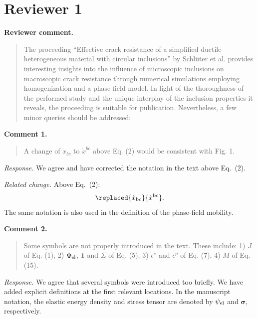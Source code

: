 \documentclass[a4paper,11pt]{article}
\newenvironment{ReviewerComment}{\begin{quote}\small}{\end{quote}}
\begin{document}
\section*{Reviewer 1}

\textbf{Reviewer comment.}
\begin{ReviewerComment}
The proceeding ``Effective crack resistance of a simplified ductile
heterogeneous material with circular inclusions'' by Schlüter et al.
provides interesting insights into the influence of microscopic
inclusions on macroscopic crack resistance through numerical
simulations employing homogenization and a phase field model. In
light of the thoroughness of the performed study and the unique
interplay of the inclusion properties it reveals, the proceeding is
suitable for publication. Nevertheless, a few minor queries should be
addressed:
\end{ReviewerComment}

\textbf{Comment 1.}
\begin{ReviewerComment}
A change of \(\dot{x}_{bc}\) to \(\dot{x}^{bc}\) above Eq. (2) would
be consistent with Fig. 1.
\end{ReviewerComment}

\emph{Response.} We agree and have corrected the notation in the
text above Eq.~(2).

\emph{Related change.} Above Eq.~(2):
\[
\replaced{\dot{x}_{\rm bc}}{\dot{x}^{\rm bc}} .
\]
The same notation is also used in the definition of the phase-field
mobility.

\textbf{Comment 2.}
\begin{ReviewerComment}
Some symbols are not properly introduced in the text. These include:
1) \(J\) of Eq. (1),
2) \(\Phi_{\rm el}\), \(\boldsymbol{1}\) and \(\Sigma\) of Eq. (5),
3) \(\epsilon^e\) and \(\epsilon^p\) of Eq. (7),
4) \(M\) of Eq. (15).
\end{ReviewerComment}

\emph{Response.} We agree that several symbols were introduced too
briefly. We have added explicit definitions at the first relevant
locations. In the manuscript notation, the elastic energy density and
stress tensor are denoted by \(\psi_{\rm el}\) and
\(\boldsymbol{\sigma}\), respectively.
\end{document}
